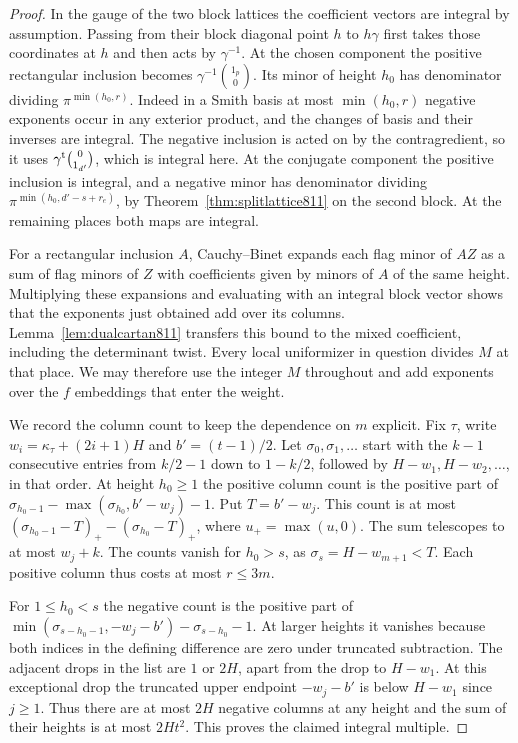 \documentclass[a4paper,11pt]{article}
\theoremstyle{definition}
\theoremstyle{remark}
\numberwithin{equation}{section}
\begin{document}
\begin{proof}
In the gauge of the two block lattices the coefficient vectors
are integral by assumption. Passing from their block diagonal
point \(h\) to \(h\gamma\) first takes those coordinates at
\(h\) and then acts by \(\gamma^{-1}\). At the chosen component
the positive rectangular inclusion becomes
\(\gamma^{-1}\binom{1_p}{0}\).
Its minor of height \(h_0\) has denominator dividing
\(\pi^{\min(h_0,r)}\). Indeed in a Smith basis at most
\(\min(h_0,r)\) negative exponents occur in any exterior
product, and the changes of basis and their inverses are
integral. The negative inclusion is acted on by the
contragredient, so it uses \(\gamma^{\rm t}\binom{0}{1_{d'}}\),
which is integral here. At the conjugate component the
positive inclusion is integral, and a negative minor has
denominator dividing \(\pi^{\min(h_0,d'-s+r_e)}\), by
Theorem~\ref{thm:splitlattice811} on the second block.
At the remaining places both maps are integral.

For a rectangular inclusion \(A\), Cauchy--Binet expands
each flag minor of \(AZ\) as a sum of flag minors of \(Z\)
with coefficients given by minors of \(A\) of the same
height. Multiplying these expansions and evaluating with
an integral block vector shows that the exponents just
obtained add over its columns. Lemma~\ref{lem:dualcartan811}
transfers this bound to the mixed coefficient, including
the determinant twist. Every local uniformizer in question
divides \(M\) at that place. We may therefore use the integer
\(M\) throughout and add exponents over the \(f\) embeddings
that enter the weight.

We record the column count to keep the dependence on \(m\)
explicit. Fix \(\tau\), write \(w_i=\kappa_\tau+(2i+1)H\)
and \(b'=(t-1)/2\). Let \(\sigma_0,\sigma_1,\ldots\) start
with the \(k-1\) consecutive entries from \(k/2-1\) down
to \(1-k/2\), followed by \(H-w_1,H-w_2,\ldots\), in that
order. At height \(h_0\ge1\) the positive column count is
the positive part of
\(\sigma_{h_0-1}-\max(\sigma_{h_0},b'-w_j)-1\).
Put \(T=b'-w_j\). This count is at most
\((\sigma_{h_0-1}-T)_+-(\sigma_{h_0}-T)_+\), where
\(u_+=\max(u,0)\). The sum telescopes to at most \(w_j+k\).
The counts vanish for \(h_0>s\), as
\(\sigma_s=H-w_{m+1}<T\). Each positive column thus costs
at most \(r\le3m\).

For \(1\le h_0<s\) the negative count is the positive part
of \(\min(\sigma_{s-h_0-1},-w_j-b')-\sigma_{s-h_0}-1\).
At larger heights it vanishes because both indices in the
defining difference are zero under truncated subtraction.
The adjacent drops in the list are \(1\)
or \(2H\), apart from the drop to \(H-w_1\). At this exceptional
drop the truncated upper endpoint \(-w_j-b'\) is below
\(H-w_1\) since \(j\ge1\). Thus there are at most \(2H\)
negative columns at any height and the sum of their heights
is at most \(2Ht^2\). This proves the claimed integral
multiple.


\end{proof}
\end{document}
